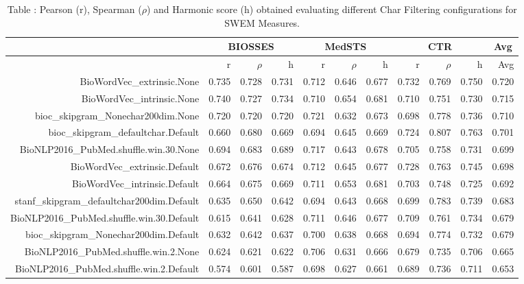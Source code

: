\begin{table}[!h]
\centering
\caption{Table \label{table:Preprocessing_charfiltering_SWEMMeasures}: Pearson (r), Spearman ($\rho$) and Harmonic score (h) obtained evaluating different Char Filtering configurations for SWEM Measures.} 
\begingroup\tiny
\begin{tabular}{rrrrrrrrrrr}
  \hline \multicolumn{1}{c}{ } & \multicolumn{3}{c}{BIOSSES} & \multicolumn{3}{c}{MedSTS} & \multicolumn{3}{c}{CTR} & \multicolumn{1}{c}{Avg} \\  \hline
 & r & $\rho$ & h & r & $\rho$ & h & r & $\rho$ & h & Avg \\ 
  \hline
BioWordVec\_extrinsic.None & 0.735 & 0.728 & 0.731 & 0.712 & 0.646 & 0.677 & 0.732 & 0.769 & 0.750 & 0.720 \\ 
  BioWordVec\_intrinsic.None & 0.740 & 0.727 & 0.734 & 0.710 & 0.654 & 0.681 & 0.710 & 0.751 & 0.730 & 0.715 \\ 
  bioc\_skipgram\_Nonechar200dim.None & 0.720 & 0.720 & 0.720 & 0.721 & 0.632 & 0.673 & 0.698 & 0.778 & 0.736 & 0.710 \\ 
  bioc\_skipgram\_defaultchar.Default & 0.660 & 0.680 & 0.669 & 0.694 & 0.645 & 0.669 & 0.724 & 0.807 & 0.763 & 0.701 \\ 
  BioNLP2016\_PubMed.shuffle.win.30.None & 0.694 & 0.683 & 0.689 & 0.717 & 0.643 & 0.678 & 0.705 & 0.758 & 0.731 & 0.699 \\ 
  BioWordVec\_extrinsic.Default & 0.672 & 0.676 & 0.674 & 0.712 & 0.645 & 0.677 & 0.728 & 0.763 & 0.745 & 0.698 \\ 
  BioWordVec\_intrinsic.Default & 0.664 & 0.675 & 0.669 & 0.711 & 0.653 & 0.681 & 0.703 & 0.748 & 0.725 & 0.692 \\ 
  stanf\_skipgram\_defaultchar200dim.Default & 0.635 & 0.650 & 0.642 & 0.694 & 0.643 & 0.668 & 0.699 & 0.783 & 0.739 & 0.683 \\ 
  BioNLP2016\_PubMed.shuffle.win.30.Default & 0.615 & 0.641 & 0.628 & 0.711 & 0.646 & 0.677 & 0.709 & 0.761 & 0.734 & 0.679 \\ 
  bioc\_skipgram\_Nonechar200dim.Default & 0.632 & 0.642 & 0.637 & 0.700 & 0.638 & 0.668 & 0.694 & 0.774 & 0.732 & 0.679 \\ 
  BioNLP2016\_PubMed.shuffle.win.2.None & 0.624 & 0.621 & 0.622 & 0.706 & 0.631 & 0.666 & 0.679 & 0.735 & 0.706 & 0.665 \\ 
  BioNLP2016\_PubMed.shuffle.win.2.Default & 0.574 & 0.601 & 0.587 & 0.698 & 0.627 & 0.661 & 0.689 & 0.736 & 0.711 & 0.653 \\ 

\end{tabular}
\end{table}
